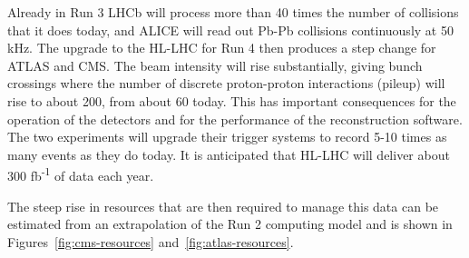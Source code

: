 \documentclass[twocolumn]{svjour3}          %
\begin{document}
Already in Run 3 LHCb will process more than 40 times the number of
collisions that it does today, and ALICE will read out Pb-Pb collisions
continuously at 50 kHz. The upgrade to the HL-LHC for Run 4 then
produces a step change for ATLAS and CMS. The beam intensity will rise
substantially, giving bunch crossings where the number of discrete
proton-proton interactions (pileup) will rise to about 200, from about 60
today. This has important consequences for the operation of the
detectors and for the performance of the reconstruction software. The
two experiments will upgrade their trigger systems to record 5-10 times
as many events as they do today. It is anticipated that HL-LHC will
deliver about 300 fb\textsuperscript{-1} of data each year.

The steep rise in resources that are then required to manage this data
can be estimated from an extrapolation of the Run 2 computing model and
is shown in Figures~\ref{fig:cms-resources} and~\ref{fig:atlas-resources}.
\end{document}
